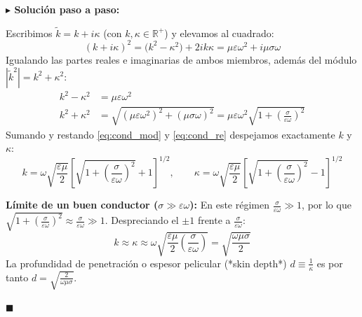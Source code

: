 \documentclass[11pt,a4paper]{book}
\newenvironment{solucion}{%
    \par\medskip\noindent\textbf{\color{blue!65!black}\Large $\blacktriangleright$ Solución paso a paso:}\par\medskip
}{%
    \hfill$\blacksquare$\par\bigskip
}
\begin{document}
\begin{solucion}
Escribimos $\tilde{k} = k + i\kappa$ (con $k, \kappa \in \mathbb{R}^+$) y elevamos al cuadrado:
\begin{equation}
    (k + i\kappa)^2 = \big(k^2 - \kappa^2\big) + 2ik\kappa = \mu\varepsilon\omega^2 + i\mu\sigma\omega
\end{equation}
Igualando las partes reales e imaginarias de ambos miembros, además del módulo $|\tilde{k}^2| = k^2 + \kappa^2$:
\begin{align}
    k^2 - \kappa^2 &= \mu\varepsilon\omega^2 \label{eq:cond_re} \\
    k^2 + \kappa^2 &= \sqrt{(\mu\varepsilon\omega^2)^2 + (\mu\sigma\omega)^2} = \mu\varepsilon\omega^2 \sqrt{1 + \left(\frac{\sigma}{\varepsilon\omega}\right)^2} \label{eq:cond_mod}
\end{align}
Sumando y restando \eqref{eq:cond_mod} y \eqref{eq:cond_re} despejamos exactamente $k$ y $\kappa$:
\begin{equation}
    k = \omega\sqrt{\frac{\varepsilon\mu}{2}}\left[ \sqrt{1 + \left(\frac{\sigma}{\varepsilon\omega}\right)^2} + 1 \right]^{1/2}, \qquad \kappa = \omega\sqrt{\frac{\varepsilon\mu}{2}}\left[ \sqrt{1 + \left(\frac{\sigma}{\varepsilon\omega}\right)^2} - 1 \right]^{1/2}
\end{equation}

\textbf{Límite de un buen conductor ($\sigma \gg \varepsilon\omega$):}
En este régimen $\frac{\sigma}{\varepsilon\omega} \gg 1$, por lo que $\sqrt{1 + \left(\frac{\sigma}{\varepsilon\omega}\right)^2} \approx \frac{\sigma}{\varepsilon\omega} \gg 1$. Despreciando el $\pm 1$ frente a $\frac{\sigma}{\varepsilon\omega}$:
\begin{equation}
    k \approx \kappa \approx \omega\sqrt{\frac{\varepsilon\mu}{2}\left(\frac{\sigma}{\varepsilon\omega}\right)} = \sqrt{\frac{\omega\mu\sigma}{2}}
\end{equation}
La profundidad de penetración o espesor pelicular (*skin depth*) $d \equiv \frac{1}{\kappa}$ es por tanto $d = \sqrt{\frac{2}{\omega\mu\sigma}}$.


\end{solucion}
\end{document}
